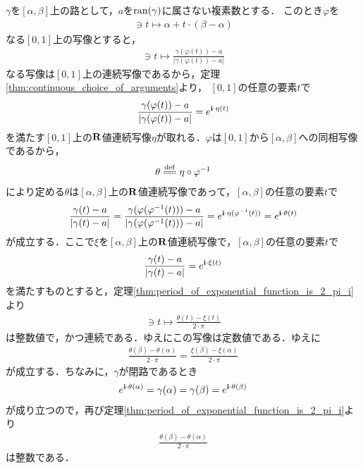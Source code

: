 	$\gamma$を$[\alpha,\beta]$上の路として，$a$を$\operatorname*{ran} (\gamma)$に属さない複素数とする．
	このとき$\varphi$を
	\begin{align}
		[0,1] \ni t \longmapsto \alpha + t \cdot (\beta - \alpha)
	\end{align}
	なる$[0,1]$上の写像とすると，
	\begin{align}
		[0,1] \ni t \longmapsto \frac{\gamma(\varphi(t)) - a}{\left|\gamma(\varphi(t)) - a\right|}
	\end{align}
	なる写像は$[0,1]$上の連続写像であるから，定理\ref{thm:continuous_choice_of_arguments}より，
	$[0,1]$の任意の要素$t$で
	\begin{align}
		\frac{\gamma(\varphi(t)) - a}{\left|\gamma(\varphi(t)) - a\right|}
		= e^{\mathbf{i} \cdot \eta(t)}
	\end{align}
	を満たす$[0,1]$上の$\mathbf{R}$値連続写像$\eta$が取れる．$\varphi$は$[0,1]$から$[\alpha,\beta]$への同相写像であるから，
	\begin{align}
		\theta \defeq \eta \circ \varphi^{-1}
	\end{align}
	により定める$\theta$は$[\alpha,\beta]$上の$\mathbf{R}$値連続写像であって，$[\alpha,\beta]$の任意の要素$t$で
	\begin{align}
		\frac{\gamma(t) - a}{\left|\gamma(t) - a\right|}
		= \frac{\gamma(\varphi(\varphi^{-1}(t))) - a}{\left|\gamma(\varphi(\varphi^{-1}(t))) - a\right|}
		= e^{\mathbf{i} \cdot \eta(\varphi^{-1}(t))}
		= e^{\mathbf{i} \cdot \theta(t)}
	\end{align}
	が成立する．ここで$\xi$を$[\alpha,\beta]$上の$\mathbf{R}$値連続写像で，$[\alpha,\beta]$の任意の要素$t$で
	\begin{align}
		\frac{\gamma(t) - a}{\left|\gamma(t) - a\right|} = e^{\mathbf{i} \cdot \xi(t)}
	\end{align}
	を満たすものとすると，定理\ref{thm:period_of_exponential_function_is_2_pi_i}より
	\begin{align}
		[\alpha,\beta] \ni t \longmapsto \frac{\theta(t) - \xi(t)}{2 \cdot \pi}
	\end{align}
	は整数値で，かつ連続である．ゆえにこの写像は定数値である．ゆえに
	\begin{align}
		\frac{\theta(\beta) - \theta(\alpha)}{2 \cdot \pi} = \frac{\xi(\beta) - \xi(\alpha)}{2 \cdot \pi}
	\end{align}
	が成立する．ちなみに，$\gamma$が閉路であるとき
	\begin{align}
		e^{\mathbf{i} \cdot \theta(\alpha)} = \gamma(\alpha) = \gamma(\beta) = e^{\mathbf{i} \cdot \theta(\beta)}
	\end{align}
	が成り立つので，再び定理\ref{thm:period_of_exponential_function_is_2_pi_i}より
	\begin{align}
		\frac{\theta(\beta) - \theta(\alpha)}{2 \cdot \pi}
	\end{align}
	は整数である．
	
